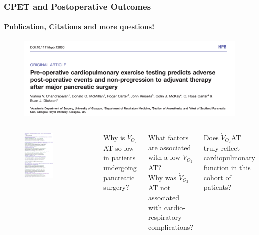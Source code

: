 \documentclass[10pt]{beamer}
\begin{document}
\begin{frame}
	\frametitle{CPET and Postoperative Outcomes}
	\framesubtitle{Publication, Citations and more questions!}
	
	\begin{figure}
		\includegraphics[width=0.6\linewidth]{cpet_hpb_publication}
	\end{figure}

	\begin{columns}[c]
			\begin{figure}
				\includegraphics[width=0.6\textwidth]{cpet_citations}
			\end{figure}
	
\pause
			{\footnotesize 	Why is $\dot{V}_{O_2}$AT so low in patients undergoing pancreatic surgery?\\
				\medskip

				What factors are associated with a low $\dot{V}_{O_2}$AT?\\
				\medskip
\pause
				Why was $\dot{V}_{O_2}$AT not associated with cardio-respiratory complications?\\
				\medskip

				Does $\dot{V}_{O_2}$AT truly reflect cardiopulmonary function in this cohort of patients?\\	
			}
			
	\end{columns}
\end{frame}
\end{document}
